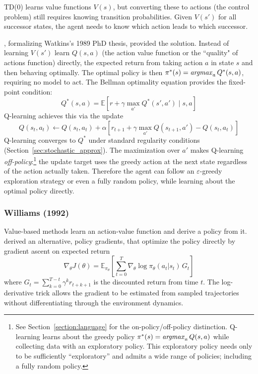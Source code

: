 TD(0) learns value functions $V(s)$, but converting these to actions (the control problem) still requires knowing transition probabilities. Given $V(s')$ for all successor states, the agent needs to know which action leads to which successor. 

\citet{WatkinsDayan1992}, formalizing Watkins's 1989 PhD thesis, provided the solution. Instead of learning $V(s')$ learn $Q(s,a)$ (the action value function or the ``quality" of actions function) directly, the expected return from taking action $a$ in state $s$ and then behaving optimally. The optimal policy is then $\pi^*(s) = \mathop{\it argmax}_a Q^*(s,a)$, requiring no model to act. The Bellman optimality equation provides the fixed-point condition:
\begin{equation}
Q^*(s,a) = \mathbb{E}\left[r + \gamma \max_{a'} Q^*(s',a') \mid s, a\right]
\end{equation}
Q-learning achieves this via the update
\begin{equation}
Q(s_t, a_t) \leftarrow Q(s_t, a_t) + \alpha \left[ r_{t+1} + \gamma \max_{a'} Q(s_{t+1}, a') - Q(s_t, a_t) \right]
\end{equation}
Q-learning converges to $Q^*$ under standard regularity conditions (Section~\ref{sec:stochastic_approx}). The maximization over $a'$ makes Q-learning \textit{off-policy}:\footnote{See Section~\ref{section:language} for the on-policy/off-policy distinction. Q-learning learns about the greedy policy $\pi^*(s) = \mathop{\it argmax}_a Q(s,a)$ while collecting data with an exploratory policy. This exploratory policy needs only to be sufficiently ``exploratory'' and admits a wide range of policies; including a fully random policy.} the update target uses the greedy action at the next state regardless of the action actually taken. Therefore the agent can follow an $\varepsilon$-greedy exploration strategy or even a fully random policy, while learning about the optimal policy directly.

\subsubsection{Williams (1992)}

Value-based methods learn an action-value function and derive a policy from it. \citet{williams1992} derived an alternative, policy gradients, that optimize the policy directly by gradient ascent on expected return
\begin{equation}
\nabla_\theta J(\theta) = \mathbb{E}_{\pi_\theta} \left[ \sum_{t=0}^{T} \nabla_\theta \log \pi_\theta(a_t|s_t) \, G_t \right]
\end{equation}
where $G_t = \sum_{k=0}^{T-t} \gamma^k r_{t+k+1}$ is the discounted return from time $t$. The log-derivative trick allows the gradient to be estimated from sampled trajectories without differentiating through the environment dynamics.

